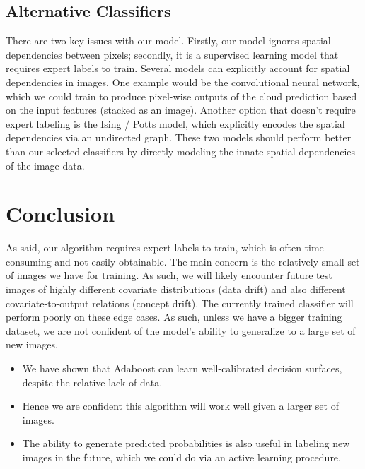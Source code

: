 \documentclass[11pt, letterpaper, journal]{IEEEtran}
\begin{document}
\subsection{Alternative Classifiers}
There are two key issues with our model. Firstly, our model ignores spatial dependencies between pixels; secondly, it is a supervised learning model that requires expert labels to train. Several models can explicitly account for spatial dependencies in images. One example would be the convolutional neural network, which we could train to produce pixel-wise outputs of the cloud prediction based on the input features (stacked as an image). Another option that doesn't require expert labeling is the Ising / Potts model, which explicitly encodes the spatial dependencies via an undirected graph. These two models should perform better than our selected classifiers by directly modeling the innate spatial dependencies of the image data.

\section{Conclusion}
As said, our algorithm requires expert labels to train, which is often time-consuming and not easily obtainable. The main concern is the relatively small set of images we have for training. As such, we will likely encounter future test images of highly different covariate distributions (data drift) and also different covariate-to-output relations (concept drift). The currently trained classifier will perform poorly on these edge cases. As such, unless we have a bigger training dataset, we are not confident of the model's ability to generalize to a large set of new images.
\begin{itemize}
    \item We have shown that Adaboost can learn well-calibrated decision surfaces, despite the relative lack of data.
    \item Hence we are confident this algorithm will work well given a larger set of images.
    \item The ability to generate predicted probabilities is also useful in labeling new images in the future, which we could do via an active learning procedure.
\end{itemize}
\end{document}
